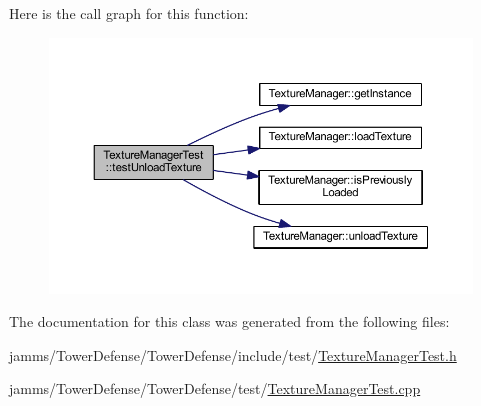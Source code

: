 Here is the call graph for this function\+:\nopagebreak
\begin{figure}[H]
\begin{center}
\leavevmode
\includegraphics[width=350pt]{class_texture_manager_test_adcea36cb8961f391b772da37416a3c76_cgraph}
\end{center}
\end{figure}




The documentation for this class was generated from the following files\+:\begin{DoxyCompactItemize}
\item 
jamms/\+Tower\+Defense/\+Tower\+Defense/include/test/\hyperlink{_texture_manager_test_8h}{Texture\+Manager\+Test.\+h}\item 
jamms/\+Tower\+Defense/\+Tower\+Defense/test/\hyperlink{_texture_manager_test_8cpp}{Texture\+Manager\+Test.\+cpp}\end{DoxyCompactItemize}
